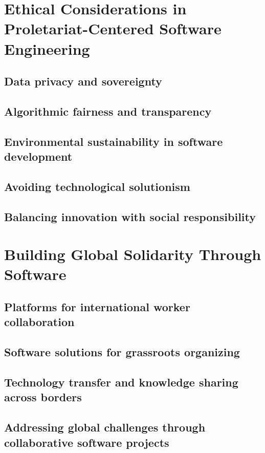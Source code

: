 \newpage

\section{Ethical Considerations in Proletariat-Centered Software Engineering}
\subsection{Data privacy and sovereignty}
\subsection{Algorithmic fairness and transparency}
\subsection{Environmental sustainability in software development}
\subsection{Avoiding technological solutionism}
\subsection{Balancing innovation with social responsibility}

\newpage

\section{Building Global Solidarity Through Software}
\subsection{Platforms for international worker collaboration}
\subsection{Software solutions for grassroots organizing}
\subsection{Technology transfer and knowledge sharing across borders}
\subsection{Addressing global challenges through collaborative software projects}

